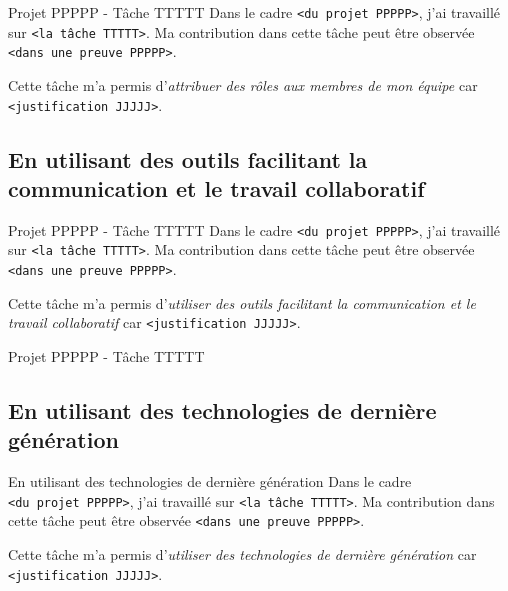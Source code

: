 \documentclass[%
    10pt,%
    usenames,%
    dvipsnames%
]{beamer}
\begin{document}
\begin{frame}[fragile]{Projet PPPPP - Tâche TTTTT}
\label{projet-ppppp---tuxe2che-ttttt-19}
Dans le cadre \texttt{\textless{}du\ projet\ PPPPP\textgreater{}}, j'ai
travaillé sur \texttt{\textless{}la\ tâche\ TTTTT\textgreater{}}. Ma
contribution dans cette tâche peut être observée
\texttt{\textless{}dans\ une\ preuve\ PPPPP\textgreater{}}.

Cette tâche m'a permis d'\emph{attribuer des rôles aux membres de mon
équipe} car \texttt{\textless{}justification\ JJJJJ\textgreater{}}.
\end{frame}

\subsection{En utilisant des outils facilitant la communication et le
travail
collaboratif}\label{en-utilisant-des-outils-facilitant-la-communication-et-le-travail-collaboratif}

\begin{frame}[fragile]{Projet PPPPP - Tâche TTTTT}
\label{projet-ppppp---tuxe2che-ttttt-20}
Dans le cadre \texttt{\textless{}du\ projet\ PPPPP\textgreater{}}, j'ai
travaillé sur \texttt{\textless{}la\ tâche\ TTTTT\textgreater{}}. Ma
contribution dans cette tâche peut être observée
\texttt{\textless{}dans\ une\ preuve\ PPPPP\textgreater{}}.

Cette tâche m'a permis d'\emph{utiliser des outils facilitant la
communication et le travail collaboratif} car
\texttt{\textless{}justification\ JJJJJ\textgreater{}}.
\end{frame}

\begin{frame}{Projet PPPPP - Tâche TTTTT}
\label{projet-ppppp---tuxe2che-ttttt-21}
\end{frame}

\subsection{En utilisant des technologies de dernière
génération}\label{en-utilisant-des-technologies-de-derniuxe8re-guxe9nuxe9ration}

\begin{frame}[fragile]{En utilisant des technologies de dernière
génération}
Dans le cadre \texttt{\textless{}du\ projet\ PPPPP\textgreater{}}, j'ai
travaillé sur \texttt{\textless{}la\ tâche\ TTTTT\textgreater{}}. Ma
contribution dans cette tâche peut être observée
\texttt{\textless{}dans\ une\ preuve\ PPPPP\textgreater{}}.

Cette tâche m'a permis d'\emph{utiliser des technologies de dernière
génération} car \texttt{\textless{}justification\ JJJJJ\textgreater{}}.
\end{frame}
\end{document}
